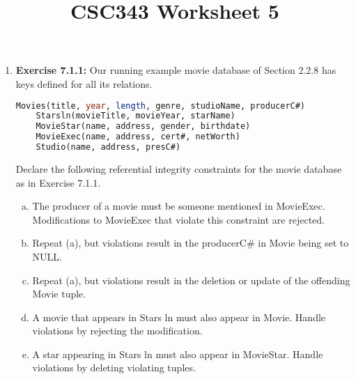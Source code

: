 \documentclass[12pt]{article}
\begin{document}
\title{CSC343 Worksheet 5}
\maketitle

\begin{enumerate}[1.]
    \item \textbf{Exercise 7.1.1:} Our running example movie database of Section
    2.2.8 has keys defined for all its relations.

    \begin{lstlisting}[language=SQL]
    Movies(title, year, length, genre, studioName, producerC#)
    Starsln(movieTitle, movieYear, starName)
    MovieStar(name, address, gender, birthdate)
    MovieExec(name, address, cert#, netWorth)
    Studio(name, address, presC#)
    \end{lstlisting}

    \bigskip

    Declare the following referential integrity constraints for the movie database as
    in Exercise 7.1.1.

    \begin{enumerate}[a)]
        \item The producer of a movie must be someone mentioned in MovieExec. Modifications to MovieExec that violate this constraint are rejected.
        \item Repeat (a), but violations result in the producerC\# in Movie being set to NULL.
        \item Repeat (a), but violations result in the deletion or update of the offending Movie tuple.
        \item A movie that appears in Stars ln must also appear in Movie. Handle violations by rejecting the modification.
        \item A star appearing in Stars ln must also appear in MovieStar. Handle violations by deleting violating tuples.
    \end{enumerate}

\end{enumerate}
\end{document}
